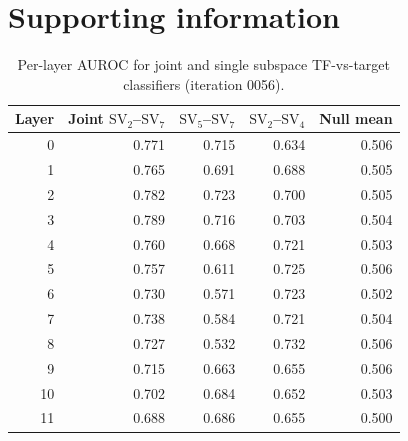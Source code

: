 \documentclass[12pt]{article}
\newcommand{\SV}[1]{\mathrm{SV}_{#1}}
\begin{document}
\clearpage
\section*{Supporting information}

\setcounter{table}{0}
\renewcommand{\thetable}{S\arabic{table}}

\begin{table}[!ht]
\centering
\caption{Per-layer AUROC for joint and single subspace TF-vs-target classifiers (iteration 0056).}
\label{tab:layer_auroc_full}
\begin{tabular}{rrrrr}
\toprule
Layer & Joint $\SV{2}$--$\SV{7}$ & $\SV{5}$--$\SV{7}$ & $\SV{2}$--$\SV{4}$ & Null mean \\
\midrule
0 & 0.771 & 0.715 & 0.634 & 0.506 \\
1 & 0.765 & 0.691 & 0.688 & 0.505 \\
2 & 0.782 & 0.723 & 0.700 & 0.505 \\
3 & 0.789 & 0.716 & 0.703 & 0.504 \\
4 & 0.760 & 0.668 & 0.721 & 0.503 \\
5 & 0.757 & 0.611 & 0.725 & 0.506 \\
6 & 0.730 & 0.571 & 0.723 & 0.502 \\
7 & 0.738 & 0.584 & 0.721 & 0.504 \\
8 & 0.727 & 0.532 & 0.732 & 0.506 \\
9 & 0.715 & 0.663 & 0.655 & 0.506 \\
10 & 0.702 & 0.684 & 0.652 & 0.503 \\
11 & 0.688 & 0.686 & 0.655 & 0.500 \\
\bottomrule
\end{tabular}
\end{table}
\end{document}
